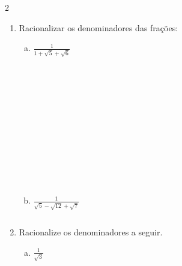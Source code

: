 \documentclass[a4paper,14pt]{article}
\begin{document}
\begin{multicols}{2}
\begin{enumerate}
\begin{enumerate}[a)]
		    	\item $\frac{5}{\sqrt{13}-\sqrt{8}}$ \\\\\\\\\\\\\\\\
		    \end{enumerate}
	        \item Racionalizar os denominadores das frações:
	        \begin{enumerate}[a)]
	        	\item $\frac{1}{1+\sqrt{5}+\sqrt{6}}$\\\\\\\\\\\\\\\\\\\\\\\\
	        	\item $\frac{1}{\sqrt{5}-\sqrt{12}+\sqrt{7}}$
	        \end{enumerate}
        $~$ \\ $~$ \\ $~$ \\ $~$ \\ $~$ \\ $~$ \\ $~$ \\ $~$ \\ $~$ \\ $~$ \\ $~$ \\ $~$ \\ $~$ \\ $~$ \\ $~$ \\ $~$ \\ $~$ \\ $~$ \\ $~$
            \item Racionalize os denominadores a seguir.
            \begin{enumerate}[a)]
            	\item $\frac{1}{\sqrt{3}}$\\\\\\\\\\

\end{enumerate}
\end{enumerate}
\end{multicols}
\end{document}
